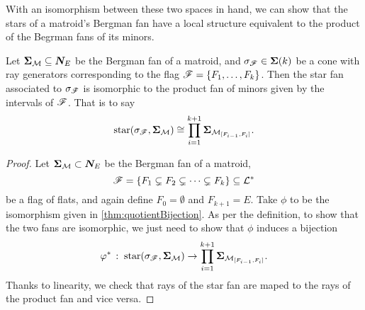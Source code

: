 \documentclass[12pt,oneside]{../../sfsuthesis}
\begin{document}
With an isomorphism between these two spaces in hand, we can show that the stars of a matroid's Bergman fan have a local structure equivalent to the product of the Begrman fans of its minors.
\begin{lemma}\th\label{thm:starBijection}
    Let \( \bm{\Sigma}_{\mathcal{M}} \subseteq \bm{N}_E \) be the Bergman fan of a matroid,
    and \( \sigma_{\mathscr{F}} \in \bm{\Sigma}(k) \) be a cone with ray generators corresponding to the flag \( \mathscr{F} = \{F_1, \dots, F_k\} \).
    Then the star fan associated to \( \sigma_{\mathscr{F}} \) is isomorphic to the product fan of minors given by the intervals of \( \mathscr{F} \).
    That is to say
    \[
        \operatorname{star}(\sigma_{\mathscr{F}}, \bm{\Sigma}_{\mathcal{M}}) \cong \prod_{i=1}^{k+1} \bm{\Sigma}_{\mathcal{M}_{[F_{i-1}, F_i]}}.
    \]
\end{lemma}
\begin{proof}
    Let \( \bm{\Sigma}_{\mathcal{M}} \subset \bm{N}_E \) be the Bergman fan of a matroid,
    \[
        \mathscr{F} = \{ F_1 \subsetneq F_2 \subsetneq \cdots \subsetneq F_k \} \subseteq \mathcal{L}^\ast
    \]
    be a flag of flats, and again define \( F_0 = \emptyset \) and \( F_{k+1} = E \).
    Take \( \phi \) to be the isomorphism given in \th\ref{thm:quotientBijection}.
    As per the definition, to show that the two fans are isomorphic, we just need to show that \( \phi \) induces a bijection
    \[
        \varphi^\ast \,:\; \operatorname{star}(\sigma_{\mathscr{F}}, \bm{\Sigma}_{\mathcal{M}}) \to \prod_{i=1}^{k+1} \bm{\Sigma}_{\mathcal{M}_{[F_{i-1}, F_i]}}.
    \]
    Thanks to linearity, we check that rays of the star fan are maped to the rays of the product fan and vice versa.



\end{proof}
\end{document}
